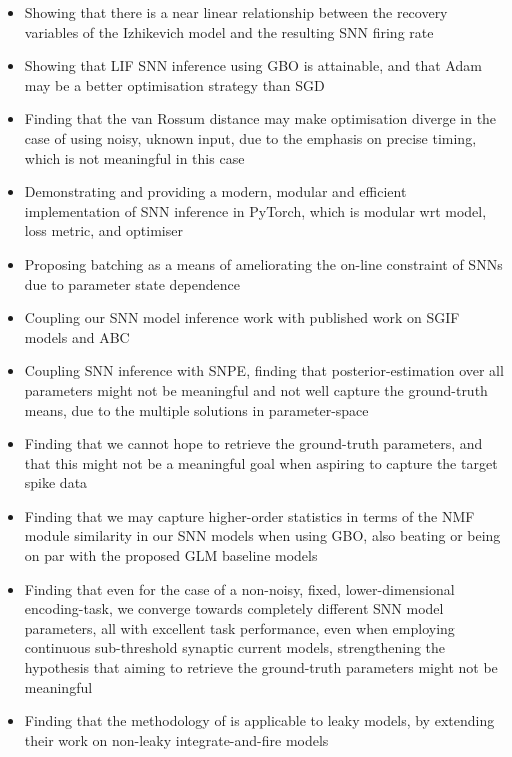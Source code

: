 \documentclass[mphil,deptreport,ianc]{infthesis} %
\begin{document}
\begin{itemize}
    \item Showing that there is a near linear relationship between the recovery variables of the Izhikevich model and the resulting SNN firing rate
    \item Showing that LIF SNN inference using GBO is attainable, and that Adam may be a better optimisation strategy than SGD
    \item Finding that the van Rossum distance may make optimisation diverge in the case of using noisy, uknown input, due to the emphasis on precise timing, which is not meaningful in this case
    \item Demonstrating and providing a modern, modular and efficient implementation of SNN inference in PyTorch, which is modular wrt model, loss metric, and optimiser
    \item Proposing batching as a means of ameliorating the on-line constraint of SNNs due to parameter state dependence
    \item Coupling our SNN model inference work with published work on SGIF models and ABC
    \item Coupling SNN inference with SNPE, finding that posterior-estimation over all parameters might not be meaningful and not well capture the ground-truth means, due to the multiple solutions in parameter-space
    \item Finding that we cannot hope to retrieve the ground-truth parameters, and that this might not be a meaningful goal when aspiring to capture the target spike data
    \item Finding that we may capture higher-order statistics in terms of the NMF module similarity in our SNN models when using GBO, also beating or being on par with the proposed GLM baseline models
    \item Finding that even for the case of a non-noisy, fixed, lower-dimensional encoding-task, we converge towards completely different SNN model parameters, all with excellent task performance, even when employing continuous sub-threshold synaptic current models, strengthening the hypothesis that aiming to retrieve the ground-truth parameters might not be meaningful
    \item Finding that the methodology of \cite{Huh2017} is applicable to leaky models, by extending their work on non-leaky integrate-and-fire models
\end{itemize}


\end{document}
